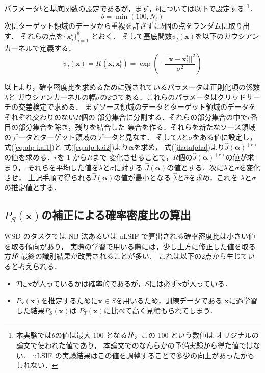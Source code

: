 \documentclass[japanese]{jnlp_1.4}
\begin{document}
パラメータ$b$と基底関数の設定であるが，まず，$b$については以下で設定する
\footnote{本実験では$b$の値は最大 100 となるが，この 100 という数値は
オリジナルの論文\cite{kanamori2009least}で使われた値であり，
本論文でのなんらかの予備実験から得た値ではない．
uLSIF の実験結果はこの値を調整することで多少の向上があったかもしれない．}．
\[
b = \min (100, N_t)
\]
次にターゲット領域のデータから重複を許さずに$b$個の点をランダムに取り出す．
それらの点を$\{ {\bm x_j^t} \}_{j=1}^b$ とおく．
そして基底関数$\psi_l ({\bm x})$を以下のガウシアンカーネルで定義する．
\[
\psi_l ({\bm x}) = K({\bm x},{\bm x_l^t}) = \exp \left( - \frac{|| {\bm x} - {\bm x_l^t} ||^2}{\sigma^2} \right)
\]

以上より，確率密度比を求めるために残されているパラメータは正則化項の係数$\lambda$と
ガウシアンカーネルの幅$\sigma$の2つである．これらのパラメータはグリッドサーチの交差検定で求める．
まずソース領域のデータとターゲット領域のデータをそれぞれ交わりのない$R$個の
部分集合に分割する．それらの部分集合の中で$r$番目の部分集合を除き，残りを結合した
集合を作る．それらを新たなソース領域のデータとターゲット領域のデータと見なす．
そして$\lambda$と$\sigma$をある値に設定し，\mbox{式(\ref{eq:alp-kai1})}と
\mbox{式(\ref{eq:alp-kai2})}より${\bm \alpha}$を求め，
\mbox{式(\ref{jhatalpha})}より$\widehat{J}({\bm \alpha})^{(r)}$の値を求める．$r$を 1 から$R$まで
変化させることで，$R$個の$\widehat{J}({\bm \alpha})^{(r)}$の値が求まり，
それらを平均した値を$\lambda$と$\sigma$に対する
$\widehat{J}({\bm \alpha})$の値とする．次に$\lambda$と$\sigma$を変化させ，
上記手順で得られる$\widehat{J}({\bm \alpha})$の値が最小となる
$\hat{\lambda}$と$\hat{\sigma}$を求め，これを
$\lambda$と$\sigma$の推定値とする．


\subsection{$P_S({\bm x})$の補正による確率密度比の算出}

WSD のタスクでは NB 法あるいは uLSIF で算出される確率密度比は小さい値を取る傾向があり，
実際の学習で用いる際には，少し上方に修正した値を取る方が
最終の識別結果が改善されることが多い．
これは以下の2点から生じていると考えられる．
\begin{itemize}
      \item $T$に${\bm x}$が入っているかは確率的であるが，$S$には必ず${\bm x}$が入っている．
      \item $P_S({\bm x})$を推定するために${\bm x} \in S$を用いるため，訓練データである
${\bm x}$に過学習した結果$P_S({\bm x})$は $P_T({\bm x})$に比べて高く見積もられてしまう．
\end{itemize}
\end{document}
